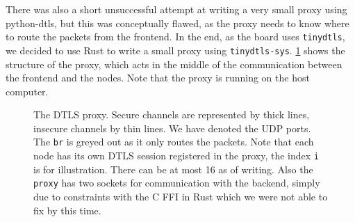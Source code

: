 \documentclass[acmtog, language=english, nonacm]{acmart}
\begin{document}
    There was also a short unsuccessful attempt at writing a very small proxy using python-dtls, but this was conceptually flawed, as the proxy needs to know where to route the packets from the frontend. In the end, as the board uses \texttt{tinydtls}, we decided to use Rust to write a small proxy using \texttt{tinydtls-sys}. \cref{fig:dtls_proxy} shows the structure of the proxy, which acts in the middle of the communication between the frontend and the nodes. Note that the proxy is running on the host computer.

    \begin{figure}[!hbtp]
        \centering
        \caption{The DTLS proxy. Secure channels are represented by thick lines, insecure channels by thin lines. We have denoted the UDP ports. The \texttt{br} is greyed out as it only routes the packets. Note that each node has its own DTLS session registered in the proxy, the index \texttt{i} is for illustration. There can be at most 16 as of writing. Also the \texttt{proxy} has two sockets for communication with the backend, simply due to constraints with the C FFI in Rust which we were not able to fix by this time.}
        \label{fig:dtls_proxy}
    \end{figure}
\end{document}
